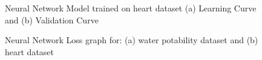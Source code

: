 \documentclass[
	letterpaper, %
]{mlreport}
\begin{document}
\begin{figure}
	\centering
	\caption{Neural Network Model trained on heart dataset (a) Learning Curve and (b) Validation Curve}
	\label{fig:fig8}
\end{figure}
\begin{figure}
	\centering
	\caption{Neural Network Loss graph for: (a) water potability dataset and (b) heart dataset}
	\label{fig:fig9}
\end{figure}
\end{document}
